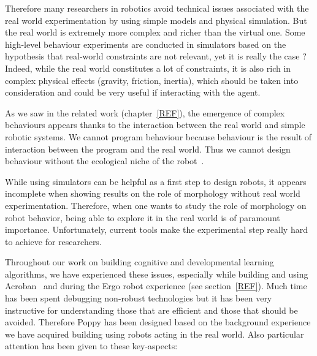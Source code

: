 Therefore many researchers in robotics avoid technical issues associated with the real world experimentation by using simple models and physical simulation. But the real world is extremely more complex and richer than the virtual one.
Some high-level behaviour experiments are conducted in simulators based on the hypothesis that real-world constraints are not relevant, yet it is really the case ?
Indeed, while the real world constitutes a lot of constraints, it is also rich in complex physical effects (gravity, friction, inertia), which should be taken into consideration and could be very useful if interacting with the agent.

As we saw in the related work (chapter~\ref{REF}), the emergence of complex behaviours appears thanks to the interaction between the real world and simple robotic systems. We cannot program behaviour because behaviour is the result of interaction  between the program and the real world. Thus we cannot design behaviour without the ecological niche of the robot~\cite{Steels1991emergence}.

While using simulators can be helpful as a first step to design robots, it appears incomplete when showing results on the role of morphology without real world experimentation.
Therefore, when one wants to study the role of morphology on robot behavior, being able to explore it in the real world is of paramount importance. Unfortunately, current tools make the experimental step really hard to achieve for researchers.

Throughout our work on building cognitive and developmental learning algorithms, we have experienced these issues, especially while building and using Acroban~\cite{Ly2010} and during the Ergo robot experience (see section~\ref{REF}). Much time has been spent debugging non-robust technologies but it has been very instructive for understanding those that are efficient and those that should be avoided.
Therefore Poppy has been designed based on the background experience we have acquired building using robots acting in the real world. Also particular attention has been given to these key-aspects:

